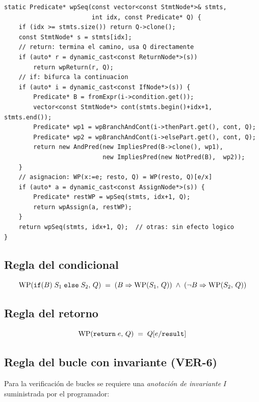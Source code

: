 \begin{lstlisting}[style=cpp, caption={wpSeq con continuaciones para retornos anticipados}]
static Predicate* wpSeq(const vector<const StmtNode*>& stmts,
                        int idx, const Predicate* Q) {
    if (idx >= stmts.size()) return Q->clone();
    const StmtNode* s = stmts[idx];
    // return: termina el camino, usa Q directamente
    if (auto* r = dynamic_cast<const ReturnNode*>(s))
        return wpReturn(r, Q);
    // if: bifurca la continuacion
    if (auto* i = dynamic_cast<const IfNode*>(s)) {
        Predicate* B = fromExpr(i->condition.get());
        vector<const StmtNode*> cont(stmts.begin()+idx+1, stmts.end());
        Predicate* wp1 = wpBranchAndCont(i->thenPart.get(), cont, Q);
        Predicate* wp2 = wpBranchAndCont(i->elsePart.get(), cont, Q);
        return new AndPred(new ImpliesPred(B->clone(), wp1),
                           new ImpliesPred(new NotPred(B),  wp2));
    }
    // asignacion: WP(x:=e; resto, Q) = WP(resto, Q)[e/x]
    if (auto* a = dynamic_cast<const AssignNode*>(s)) {
        Predicate* restWP = wpSeq(stmts, idx+1, Q);
        return wpAssign(a, restWP);
    }
    return wpSeq(stmts, idx+1, Q);  // otras: sin efecto logico
}
\end{lstlisting}

\subsection{Regla del condicional}

\begin{regla}[Condicional]
\[
  \WP{\texttt{if}(B)\;S_1\;\texttt{else}\;S_2}{Q}
  \;=\;
  (B \Rightarrow \WP{S_1}{Q}) \;\wedge\; (\neg B \Rightarrow \WP{S_2}{Q})
\]
\end{regla}

\subsection{Regla del retorno}

\begin{regla}[Return]
\[
  \WP{\texttt{return}\;e}{Q} \;=\; \subst{Q}{\mathtt{result}}{e}
\]
\end{regla}

\subsection{Regla del bucle con invariante (VER-6)}

Para la verificación de bucles se requiere una \emph{anotación de invariante}
$I$ suministrada por el programador:

